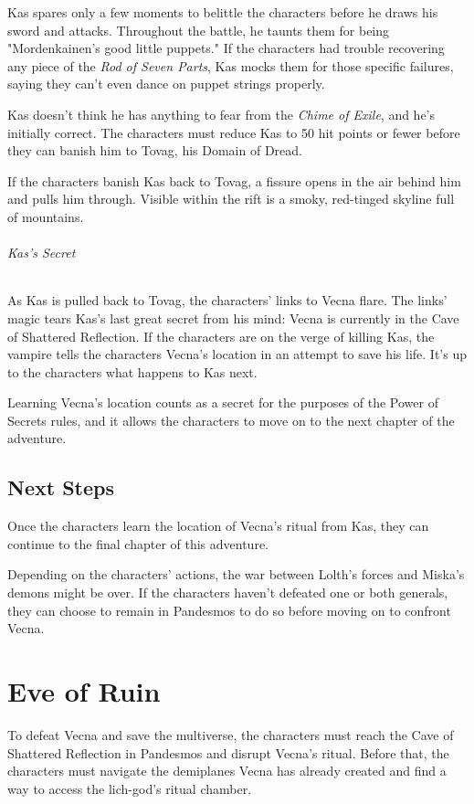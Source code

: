 \documentclass[10pt,a4paper,twoside,bg=print,twocolumn,openany,nodeprecatedcode]{dndbook}
\begin{document}
Kas spares only a few moments to belittle the characters before he draws his sword and attacks. Throughout the battle, he taunts them for being "Mordenkainen's good little puppets." If the characters had trouble recovering any piece of the \textit{Rod of Seven Parts}, Kas mocks them for those specific failures, saying they can't even dance on puppet strings properly.

Kas doesn't think he has anything to fear from the \textit{Chime of Exile}, and he's initially correct. The characters must reduce Kas to 50 hit points or fewer before they can banish him to Tovag, his Domain of Dread.

If the characters banish Kas back to Tovag, a fissure opens in the air behind him and pulls him through. Visible within the rift is a smoky, red-tinged skyline full of mountains.

\subparagraph{Kas's Secret}
As Kas is pulled back to Tovag, the characters' links to Vecna flare. The links' magic tears Kas's last great secret from his mind: Vecna is currently in the Cave of Shattered Reflection. If the characters are on the verge of killing Kas, the vampire tells the characters Vecna's location in an attempt to save his life. It's up to the characters what happens to Kas next.

Learning Vecna's location counts as a secret for the purposes of the Power of Secrets rules, and it allows the characters to move on to the next chapter of the adventure.

\section{Next Steps}
Once the characters learn the location of Vecna's ritual from Kas, they can continue to the final chapter of this adventure.

Depending on the characters' actions, the war between Lolth's forces and Miska's demons might be over. If the characters haven't defeated one or both generals, they can choose to remain in Pandesmos to do so before moving on to confront Vecna.

\chapter{Eve of Ruin}
To defeat Vecna and save the multiverse, the characters must reach the Cave of Shattered Reflection in Pandesmos and disrupt Vecna's ritual. Before that, the characters must navigate the demiplanes Vecna has already created and find a way to access the lich-god's ritual chamber.
\end{document}
